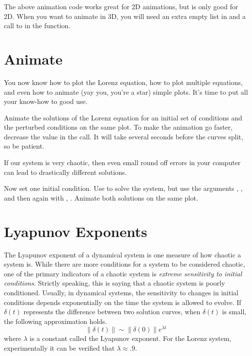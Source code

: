 \begin{warn}
The above animation code works great for 2D animations, but  is only good for 2D. When you want to animate in 3D, you will need an extra empty list in  and a call to  in the  function.
\end{warn}

\section*{Animate}
You now know how to plot the Lorenz equation, how to plot multiple equations, and even how to animate (yay you, you're a star) simple plots.
It's time to put all your know-how to good use.

\begin{problem}
Animate the solutions of the Lorenz equation for an initial set of conditions and the perturbed conditions on the same plot.
To make the animation go faster, decrease the  value in the  call.
It will take several seconds before the curves split, so be patient.
\end{problem}

If our system is very chaotic, then even small round off errors in your computer can lead to drastically different solutions.

\begin{problem}
Now set one initial condition.
Use  to solve the system, but use the arguments , , and then again with , .
Animate both solutions on the same plot.
\end{problem}

\section*{Lyapunov Exponents}
The Lyapunov exponent of a dynamical system is one measure of how chaotic a system is.
While there are more conditions for a system to be considered chaotic, one of the primary indicators of a chaotic system is \emph{extreme sensitivity to initial conditions}.
Strictly speaking, this is saying that a chaotic system is poorly conditioned.
Usually, in dynamical systems, the sensitivity to changes in initial conditions depends exponentially on the time the system is allowed to evolve.
If $\delta(t)$ represents the difference between two solution curves, when $\delta(t)$ is small, the following approximation holds.
\[\|\delta(t)\| \sim \|\delta(0)\| e^{\lambda t}\]
where $\lambda$ is a constant called the Lyapunov exponent.
For the Lorenz system, experimentally it can be verified that $\lambda \approx .9$.


